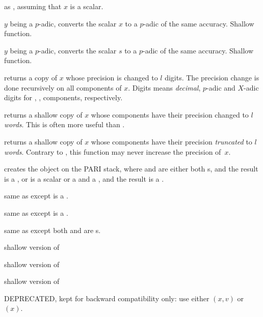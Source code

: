 as , assuming that $x$
is a scalar.

 $y$ being a $p$-adic, converts the scalar $x$
to a $p$-adic of the same accuracy. Shallow function.

 $y$ being a $p$-adic, converts the scalar $s$
to a $p$-adic of the same accuracy. Shallow function.

 returns a copy of $x$ whose precision is
changed to $l$ digits. The precision change is done recursively on all
components of $x$. Digits means \emph{decimal}, $p$-adic and $X$-adic digits
for , ,  components, respectively.

 returns a shallow copy of $x$ whose
 components have their precision changed to $l$ \emph{words}. This
is often more useful than .

 returns a shallow copy of $x$ whose
 components have their precision \emph{truncated} to $l$
\emph{words}. Contrary to , this function may never increase
the precision of~$x$.


 creates the object  on
the PARI stack, where  and  are either both s, and the
result is a , or  is a scalar or a  and  a
, and the result is a .

 same as  except  is a
.

 same as  except  is a
.

 same as  except both
 and  are s.

 shallow version of 

 shallow version of 

 shallow version of 

 DEPRECATED, kept for backward
compatibility only: use either $(x,v)$ or $(x)$.

